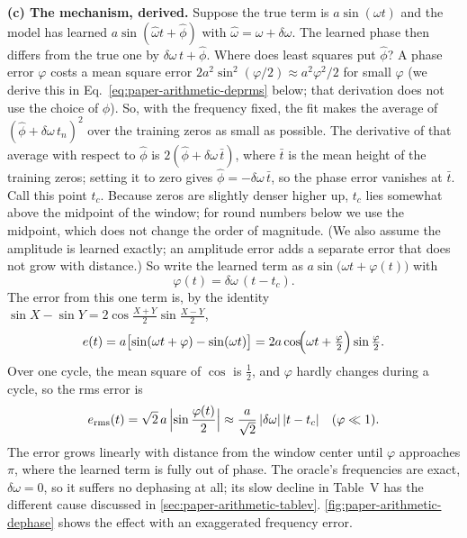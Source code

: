 \textbf{(c) The mechanism, derived.} Suppose the true term is $a\sin(\omega t)$ and the model has learned $a\sin(\hat\omega t+\hat\phi)$ with $\hat\omega=\omega+\delta\omega$. The learned phase then differs from the true one by $\delta\omega\,t+\hat\phi$. Where does least squares put $\hat\phi$? A phase error $\varphi$ costs a mean square error $2a^2\sin^2(\varphi/2)\approx a^2\varphi^2/2$ for small $\varphi$ (we derive this in Eq.~\eqref{eq:paper-arithmetic-deprms} below; that derivation does not use the choice of $\hat\phi$). So, with the frequency fixed, the fit makes the average of $(\hat\phi+\delta\omega\,t_n)^2$ over the training zeros as small as possible. The derivative of that average with respect to $\hat\phi$ is $2(\hat\phi+\delta\omega\,\bar t)$, where $\bar t$ is the mean height of the training zeros; setting it to zero gives $\hat\phi=-\delta\omega\,\bar t$, so the phase error vanishes at $\bar t$. Call this point $t_c$. Because zeros are slightly denser higher up, $t_c$ lies somewhat above the midpoint of the window; for round numbers below we use the midpoint, which does not change the order of magnitude. (We also assume the amplitude is learned exactly; an amplitude error adds a separate error that does not grow with distance.) So write the learned term as $a\sin\bigl(\omega t+\varphi(t)\bigr)$ with
\begin{equation}
\varphi(t)=\delta\omega\,(t-t_c).
\label{eq:paper-arithmetic-phase}
\end{equation}
The error from this one term is, by the identity $\sin X-\sin Y=2\cos\frac{X+Y}{2}\sin\frac{X-Y}{2}$,
\begin{equation}
e(t)=a\bigl[\sin(\omega t+\varphi)-\sin(\omega t)\bigr]
=2a\cos\!\Bigl(\omega t+\tfrac{\varphi}{2}\Bigr)\sin\tfrac{\varphi}{2}.
\label{eq:paper-arithmetic-deperr}
\end{equation}
Over one cycle, the mean square of $\cos$ is $\tfrac12$, and $\varphi$ hardly changes during a cycle, so the rms error is
\begin{equation}
e_{\rm rms}(t)=\sqrt2\,a\,\Bigl|\sin\frac{\varphi(t)}{2}\Bigr| \approx \frac{a}{\sqrt2}\,|\delta\omega|\,|t-t_c|\quad(\varphi\ll1).
\label{eq:paper-arithmetic-deprms}
\end{equation}
The error grows linearly with distance from the window center until $\varphi$ approaches $\pi$, where the learned term is fully out of phase. The oracle's frequencies are exact, $\delta\omega=0$, so it suffers no dephasing at all; its slow decline in Table~V has the different cause discussed in \cref{sec:paper-arithmetic-tablev}. \cref{fig:paper-arithmetic-dephase} shows the effect with an exaggerated frequency error.

